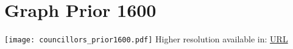 \section{Graph Prior 1600}
\texttt{[image: councillors\_prior1600.pdf]}
Higher resolution available in: \url{URL}